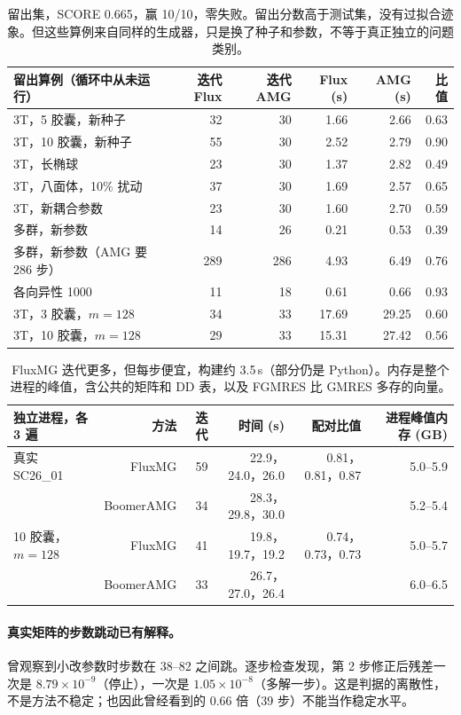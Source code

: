 \documentclass[11pt,a4paper]{ctexart}
\begin{document}
\begin{table}[H]
\centering\footnotesize\setlength{\tabcolsep}{4pt}
\begin{tabular}{lrrrrr}
\toprule
留出算例（循环中从未运行） & 迭代 Flux & 迭代 AMG & Flux (s) & AMG (s) & 比值 \\
\midrule
3T，5 胶囊，新种子 & 32 & 30 & 1.66 & 2.66 & 0.63 \\
3T，10 胶囊，新种子 & 55 & 30 & 2.52 & 2.79 & 0.90 \\
3T，长椭球 & 23 & 30 & 1.37 & 2.82 & 0.49 \\
3T，八面体，10\% 扰动 & 37 & 30 & 1.69 & 2.57 & 0.65 \\
3T，新耦合参数 & 23 & 30 & 1.60 & 2.70 & 0.59 \\
多群，新参数 & 14 & 26 & 0.21 & 0.53 & 0.39 \\
多群，新参数（AMG 要 286 步） & 289 & 286 & 4.93 & 6.49 & 0.76 \\
各向异性 1000 & 11 & 18 & 0.61 & 0.66 & 0.93 \\
3T，3 胶囊，$m=128$ & 34 & 33 & 17.69 & 29.25 & 0.60 \\
3T，10 胶囊，$m=128$ & 29 & 33 & 15.31 & 27.42 & 0.56 \\
\bottomrule
\end{tabular}
\caption{留出集，SCORE 0.665，赢 10/10，零失败。留出分数高于测试集，没有过拟合迹象。但这些算例来自同样的生成器，只是换了种子和参数，不等于真正独立的问题类别。}
\end{table}

\begin{table}[H]
\centering\small
\begin{tabular}{lrrrrr}
\toprule
独立进程，各 3 遍 & 方法 & 迭代 & 时间 (s) & 配对比值 & 进程峰值内存 (GB) \\
\midrule
真实 SC26\_01 & FluxMG & 59 & 22.9，24.0，26.0 & 0.81，0.81，0.87 & 5.0--5.9 \\
 & BoomerAMG & 34 & 28.3，29.8，30.0 & & 5.2--5.4 \\
10 胶囊，$m=128$ & FluxMG & 41 & 19.8，19.7，19.2 & 0.74，0.73，0.73 & 5.0--5.7 \\
 & BoomerAMG & 33 & 26.7，27.0，26.4 & & 6.0--6.5 \\
\bottomrule
\end{tabular}
\caption{FluxMG 迭代更多，但每步便宜，构建约 3.5\,s（部分仍是 Python）。内存是整个进程的峰值，含公共的矩阵和 DD 表，以及 FGMRES 比 GMRES 多存的向量。}
\end{table}

\paragraph{真实矩阵的步数跳动已有解释。}曾观察到小改参数时步数在 38--82 之间跳。逐步检查发现，第 2 步修正后残差一次是 $8.79\times10^{-9}$（停止），一次是 $1.05\times10^{-8}$（多解一步）。这是判据的离散性，不是方法不稳定；也因此曾经看到的 0.66 倍（39 步）不能当作稳定水平。
\end{document}
